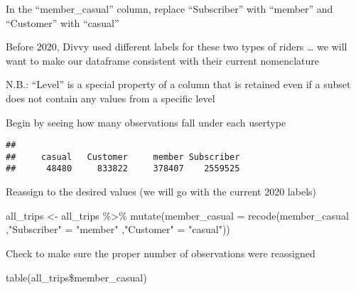 \documentclass[
]{article}
\newenvironment{Shaded}{\begin{snugshade}}{\end{snugshade}}
\newcommand{\AttributeTok}[1]{\textcolor[rgb]{0.77,0.63,0.00}{#1}}
\newcommand{\FunctionTok}[1]{\textcolor[rgb]{0.00,0.00,0.00}{#1}}
\newcommand{\NormalTok}[1]{#1}
\newcommand{\OtherTok}[1]{\textcolor[rgb]{0.56,0.35,0.01}{#1}}
\newcommand{\SpecialCharTok}[1]{\textcolor[rgb]{0.00,0.00,0.00}{#1}}
\newcommand{\StringTok}[1]{\textcolor[rgb]{0.31,0.60,0.02}{#1}}
\begin{document}
In the ``member\_casual'' column, replace ``Subscriber'' with ``member''
and ``Customer'' with ``casual''

Before 2020, Divvy used different labels for these two types of riders
\ldots{} we will want to make our dataframe consistent with their
current nomenclature

N.B.: ``Level'' is a special property of a column that is retained even
if a subset does not contain any values from a specific level

Begin by seeing how many observations fall under each usertype

\begin{Shaded}
\end{Shaded}

\begin{verbatim}
## 
##     casual   Customer     member Subscriber 
##      48480     833822     378407    2559525
\end{verbatim}

Reassign to the desired values (we will go with the current 2020 labels)

\begin{Shaded}
\begin{Highlighting}[]
\NormalTok{all\_trips }\OtherTok{\textless{}{-}}\NormalTok{  all\_trips }\SpecialCharTok{\%\textgreater{}\%} 
  \FunctionTok{mutate}\NormalTok{(}\AttributeTok{member\_casual =} \FunctionTok{recode}\NormalTok{(member\_casual}
\NormalTok{                           ,}\StringTok{"Subscriber"} \OtherTok{=} \StringTok{"member"}
\NormalTok{                           ,}\StringTok{"Customer"} \OtherTok{=} \StringTok{"casual"}\NormalTok{))}
\end{Highlighting}
\end{Shaded}

Check to make sure the proper number of observations were reassigned

table(all\_trips\$member\_casual)

\begin{Shaded}
\end{Shaded}
\end{document}
